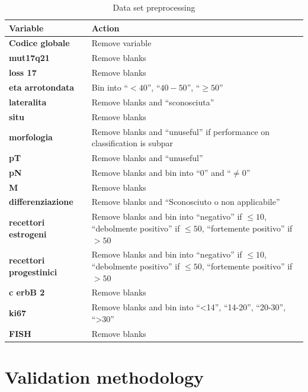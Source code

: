 \begin{table}[htbp]
\caption{Data set preprocessing}
\begin{tabularx}{\textwidth}{@{} l Y @{}}
\toprule 
\textbf{Variable} & Action \\
\midrule 
\textbf{Codice globale} & Remove variable \\
\textbf{mut17q21} & Remove blanks \\
\textbf{loss 17} & Remove blanks \\
\textbf{eta arrotondata} & Bin into \enquote{$< 40$}, \enquote{$40-50$}, \enquote{$\geq 50$}\\
\textbf{lateralita} & Remove blanks and \enquote{sconosciuta} \\
\textbf{situ} & Remove blanks \\ \addlinespace
\textbf{morfologia} & Remove blanks and \enquote{unuseful} if performance on classification is subpar \\ \addlinespace
\textbf{pT} & Remove blanks and \enquote{unuseful}  \\
\textbf{pN} & Remove blanks and bin into \enquote{0} and \enquote{$\neq0$}\\
\textbf{M} & Remove blanks \\ 
\textbf{differenziazione} & Remove blanks and \enquote{Sconosciuto o non applicabile} \\ \addlinespace
\textbf{recettori estrogeni} & Remove blanks and bin into \enquote{negativo} if $\leq 10$,
		\enquote{debolmente positivo} if $\leq 50$, 
		\enquote{fortemente positivo} if $> 50$ \\ \addlinespace
\textbf{recettori progestinici} & Remove blanks and bin into \enquote{negativo} if $\leq 10$, 
		\enquote{debolmente positivo} if $\leq 50$, 
		\enquote{fortemente positivo} if $> 50$ \\ \addlinespace
\textbf{c erbB 2} & Remove blanks \\ 
\textbf{ki67} & Remove blanks and bin into \enquote{<14}, 
		\enquote{14-20}, \enquote{20-30}, \enquote{>30} \\ 
\textbf{FISH} & Remove blanks \\
\bottomrule
\end{tabularx}
\label{tab:datasetpreprocess}
\end{table}

\section{Validation methodology}





